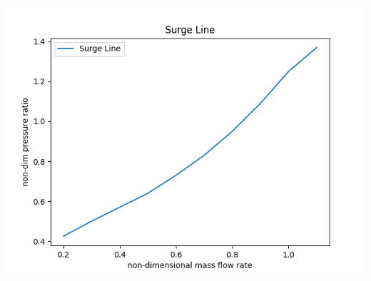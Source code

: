 \documentclass[12pt,english]{article}
\begin{document}
\begin{enumerate}
\begin{center}
        \includegraphics[width=\textwidth]{CompressorMap3.png}

    \end{center}
\end{enumerate}
\end{document}
